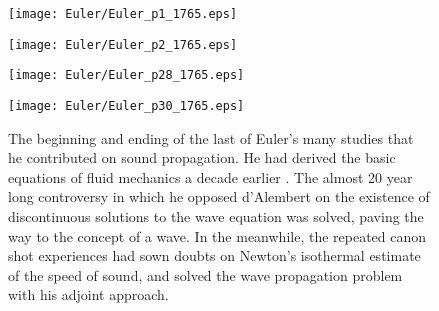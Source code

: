 


\begin{figure}[!h]
\centering
\texttt{[image: Euler/Euler\_p1\_1765.eps]}

\hspace{-1.3cm}
\texttt{[image: Euler/Euler\_p2\_1765.eps]}
\end{figure}

\begin{figure}[!h]
\centering
\texttt{[image: Euler/Euler\_p28\_1765.eps]}

\hspace{-0.5cm}
\texttt{[image: Euler/Euler\_p30\_1765.eps]}
\caption*{The beginning and ending of the last of Euler's \citeyearpar{Euler_1767} many studies that he contributed on sound propagation. He had derived the basic equations of fluid mechanics a decade earlier \citeyearpar{Euler_1757}. The almost 20 year long controversy in which he opposed d'Alembert on the existence of discontinuous solutions to the wave equation was solved, paving the way to the concept of a wave.
In the meanwhile, the repeated canon shot experiences had sown doubts on Newton's isothermal estimate of the speed of sound, and \citet{Lagrange_1761} solved the wave propagation problem with his adjoint approach.}
\label{fig:Euler_conclusion}
\end{figure}

